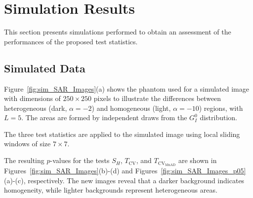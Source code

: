 \documentclass[remotesensing,article,submit,moreauthors,pdftex]{Definitions/mdpi}
\begin{document}
\hypertarget{sec:Results}{%
\section{Simulation Results}\label{sec:Results}}

This section presents simulations performed to obtain an assessment of
the performances of the proposed test statistics.

\hypertarget{simulated-data}{%
\subsection{Simulated Data}\label{simulated-data}}

Figure~\ref{fig:sim_SAR_Images}(a) shows the phantom used for a
simulated image with dimensions of \(250\times 250\) pixels to
illustrate the differences between heterogeneous (dark, \(\alpha=-2\))
and homogeneous (light, \(\alpha=-10\)) regions, with \(L = 5\). The
areas are formed by independent draws from the \(G^0_I\) distribution.

The three test statistics are applied to the simulated image using local
sliding windows of size \(7\times 7\).

The resulting \(p\)-values for the tests \(S_H\), \(T_{\text{CV}}\), and
\(T_{\text{CV}_{\text{MnAD}}}\) are shown in
Figures~\ref{fig:sim_SAR_Images}(b)-(d) and
Figures~\ref{fig:sim_SAR_Images_p05}(a)-(c), respectively. The new
images reveal that a darker background indicates homogeneity, while
lighter backgrounds represent heterogeneous areas.
\end{document}
